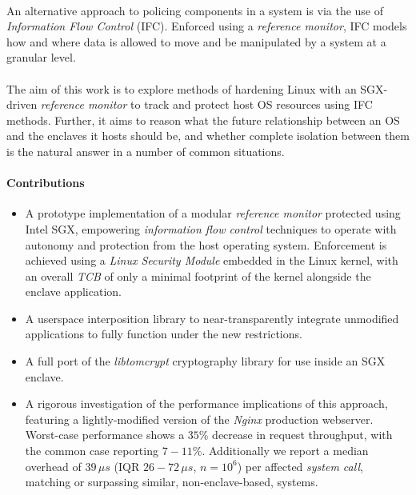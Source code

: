 \paragraph{} An alternative approach to policing components in a system is via the use of \textit{Information Flow Control} (IFC). Enforced using a \textit{reference monitor}, IFC models how and where data is allowed to move and be manipulated by a system at a granular level.

\paragraph{} The aim of this work is to explore methods of hardening Linux with an SGX-driven \textit{reference monitor} to track and protect host OS resources using IFC methods. Further, it aims to reason what the future relationship between an OS and the enclaves it hosts should be, and whether complete isolation between them is the natural answer in a number of common situations.


\paragraph{Contributions}
\begin{itemize}
    \item A prototype implementation of a modular \textit{reference monitor} protected using Intel SGX, empowering \textit{information flow control} techniques to operate with autonomy and protection from the host operating system. Enforcement is achieved using a \textit{Linux Security Module} embedded in the Linux kernel, with an overall \textit{TCB} of only a minimal footprint of the kernel alongside the enclave application.
    \item A userspace interposition library to near-transparently integrate unmodified applications to fully function under the new restrictions.
    \item A full port of the \textit{libtomcrypt} cryptography library for use inside an SGX enclave.
    \item A rigorous investigation of the performance implications of this approach, featuring a lightly-modified version of the \textit{Nginx} production webserver. Worst-case performance shows a $35$\% decrease in request throughput, with the common case reporting $7-11$\%. Additionally we report a median overhead of $39\,\mu s$ (IQR $26-72\,\mu s$, $n = 10^6$) per affected \textit{system call}, matching or surpassing similar, non-enclave-based, systems.
\end{itemize}